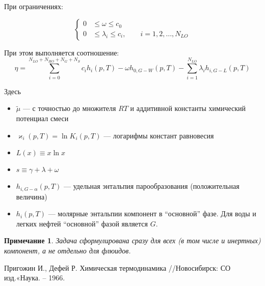 \documentclass[12pt]{article}
\newtheorem{note}{Примечание}[section]
\begin{document}
При ограничениях:

\[
\left\{
\begin{aligned}
0& \leq \omega \leq c_0\\
0& \leq \lambda_i \leq c_i, \qquad i = 1,2,\dots,N_{LO}
\end{aligned}
\right.
\]

При этом выполняется соотношение:
\[
\eta = 
\sum_{i=0}^{N_{LO}+N_{HO}+N_{G}+N_{S}} c_i h_i(p,T) -\omega h_{0,G-W}(p,T) -\sum_{i=1}^{N_{LO}} \lambda_i h_{i,G-L}(p,T) 
\]

Здесь
\begin{itemize}
\item $\tilde{\mu}$ --- с точностью до множителя $RT$ и аддитивной константы химический потенциал смеси
\item $\varkappa_i(p, T) = \ln K_i(p, T)$ --- логарифмы констант равновесия
\item $L(x) \equiv x \ln x$
\item $s \equiv \gamma + \lambda + \omega$
\item $h_{i,G-\alpha}(p,T)$ --- удельная энтальпия парообразования (положительная величина)
\item $h_i(p,T)$ --- молярные энтальпии компонент в ``основной'' фазе. Для воды и легких нефтей ``основной'' фазой является $G$.
\end{itemize}

\begin{note}
Задача сформулирована сразу для всех (в том числе и инертных) компонент, а не отдельно для флюидов.
\end{note}


\begin{thebibliography}{9}
     Пригожин И., Дефей Р. Химическая термодинамика //Новосибирск: СО изд.«Наука. – 1966.
\end{thebibliography}
\end{document}
